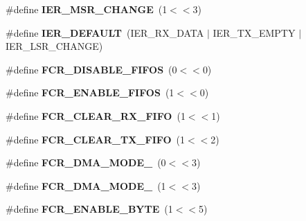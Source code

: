 \begin{DoxyCompactItemize}
\item 
\hypertarget{group__hal__dos_gaf722d4c4e6617d62b6a2ea4f8fcdc7a3}{\#define {\bfseries I\-E\-R\-\_\-\-M\-S\-R\-\_\-\-C\-H\-A\-N\-G\-E}~(1$<$$<$3)}\label{group__hal__dos_gaf722d4c4e6617d62b6a2ea4f8fcdc7a3}

\item 
\hypertarget{group__hal__dos_ga90f46b37cc5f1208e83a0a027e83f2c8}{\#define {\bfseries I\-E\-R\-\_\-\-D\-E\-F\-A\-U\-L\-T}~(I\-E\-R\-\_\-\-R\-X\-\_\-\-D\-A\-T\-A $|$ I\-E\-R\-\_\-\-T\-X\-\_\-\-E\-M\-P\-T\-Y $|$ I\-E\-R\-\_\-\-L\-S\-R\-\_\-\-C\-H\-A\-N\-G\-E)}\label{group__hal__dos_ga90f46b37cc5f1208e83a0a027e83f2c8}

\item 
\hypertarget{group__hal__dos_ga50ff8e2789f5f8485ad903fa36cb5ff4}{\#define {\bfseries F\-C\-R\-\_\-\-D\-I\-S\-A\-B\-L\-E\-\_\-\-F\-I\-F\-O\-S}~(0$<$$<$0)}\label{group__hal__dos_ga50ff8e2789f5f8485ad903fa36cb5ff4}

\item 
\hypertarget{group__hal__dos_gacbbf96e0ad7b0c0ce83ded2a69b7edd6}{\#define {\bfseries F\-C\-R\-\_\-\-E\-N\-A\-B\-L\-E\-\_\-\-F\-I\-F\-O\-S}~(1$<$$<$0)}\label{group__hal__dos_gacbbf96e0ad7b0c0ce83ded2a69b7edd6}

\item 
\hypertarget{group__hal__dos_gaab7aea2b0a8ad9fbaf3e59d3f069c38c}{\#define {\bfseries F\-C\-R\-\_\-\-C\-L\-E\-A\-R\-\_\-\-R\-X\-\_\-\-F\-I\-F\-O}~(1$<$$<$1)}\label{group__hal__dos_gaab7aea2b0a8ad9fbaf3e59d3f069c38c}

\item 
\hypertarget{group__hal__dos_ga37c91cd823b315b67cb9d1bbf902feb4}{\#define {\bfseries F\-C\-R\-\_\-\-C\-L\-E\-A\-R\-\_\-\-T\-X\-\_\-\-F\-I\-F\-O}~(1$<$$<$2)}\label{group__hal__dos_ga37c91cd823b315b67cb9d1bbf902feb4}

\item 
\hypertarget{group__hal__dos_gae6161db9bf7143fe70cf25f70998c9c0}{\#define {\bfseries F\-C\-R\-\_\-\-D\-M\-A\-\_\-\-M\-O\-D\-E\-\_}~(0$<$$<$3)}\label{group__hal__dos_gae6161db9bf7143fe70cf25f70998c9c0}

\item 
\hypertarget{group__hal__dos_gac313793a646e3df0162722cb7ae49ef1}{\#define {\bfseries F\-C\-R\-\_\-\-D\-M\-A\-\_\-\-M\-O\-D\-E\-\_}~(1$<$$<$3)}\label{group__hal__dos_gac313793a646e3df0162722cb7ae49ef1}

\item 
\hypertarget{group__hal__dos_gafc8e8e20ec7621118f93a5bf7bc81c4b}{\#define {\bfseries F\-C\-R\-\_\-\-E\-N\-A\-B\-L\-E\-\_\-B\-Y\-T\-E}~(1$<$$<$5)}\label{group__hal__dos_gafc8e8e20ec7621118f93a5bf7bc81c4b}


\end{DoxyCompactItemize}
